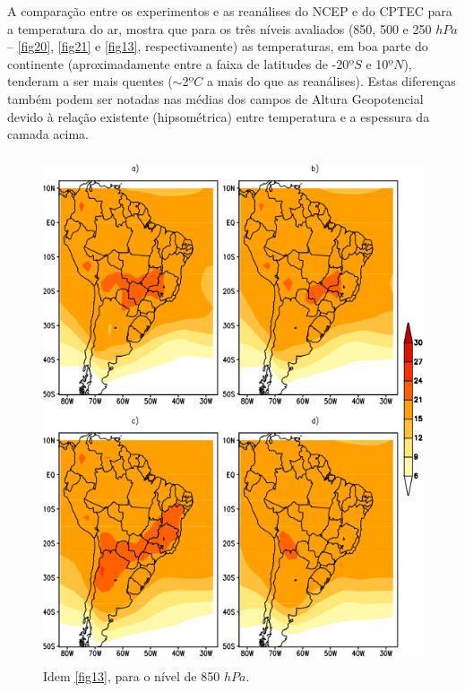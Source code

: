 A comparação entre os experimentos e as reanálises do NCEP e do CPTEC para a temperatura do ar, mostra que para os três níveis avaliados (850, 500 e 250 $hPa$ – \autoref{fig20}, \autoref{fig21} e \autoref{fig13}, respectivamente) as temperaturas, em boa parte do continente (aproximadamente entre a faixa de latitudes de -20$ºS$ e 10$ºN$), tenderam a ser mais quentes ($\sim$2$ºC$ a mais do que as reanálises). Estas diferenças também podem ser notadas nas médias dos campos de Altura Geopotencial devido à relação existente (hipsométrica) entre temperatura e a espessura da camada acima.

\begin{figure}[!hbp]
\centering
\includegraphics[height=15cm]{./figs/media_temp_anl_850hPa.png}
\caption{Idem \autoref{fig13}, para o nível de 850 $hPa$.}
\label{fig20}
\end{figure}

